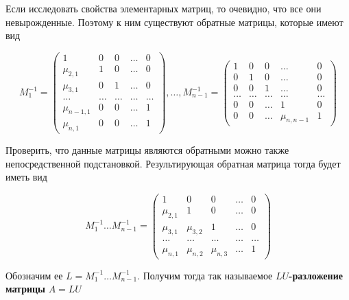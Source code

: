\documentclass[a4paper,article,14pt]{extarticle}
\begin{document}
Если исследовать свойства элементарных матриц, то очевидно,
что все они невырожденные. Поэтому к ним существуют обратные матрицы,
которые имеют вид

\begin{equation}
    M_1^{-1} = \left(
        \begin{matrix}
            1 & 0 & 0 & \dots & 0 \\
            \mu_{2, 1} & 1 & 0 & \dots & 0 \\
            \mu_{3, 1} & 0 & 1 & \dots & 0 \\
            \dots & \dots & \dots & \dots & \dots \\
            \mu_{n - 1, 1} & 0 & 0 & \dots & 1 \\
            \mu_{n, 1} & 0 & 0 & \dots & 1 
        \end{matrix}
    \right),
    \dots,
    M_{n - 1}^{-1} = \left(
        \begin{matrix}
            1 & 0 & 0 & \dots & 0 \\
            0 & 1 & 0 & \dots & 0 \\
            0 & 0 & 1 & \dots & 0 \\
            \dots & \dots & \dots & \dots & \dots \\ 
            0 & 0 & \dots & 1 & 0 \\
            0 & 0 & \dots & \mu_{n, n - 1} & 1 
        \end{matrix}
    \right)
\end{equation}

Проверить, что данные матрицы являются обратными можно
также непосредственной подстановкой. Результирующая обратная матрица
тогда будет иметь вид

\begin{equation}
    M_1^{-1} \dots M_{n - 1}^{-1} = \left(
        \begin{matrix}
            1 & 0 & 0 & \dots & 0 \\
            \mu_{2, 1} & 1 & 0 & \dots & 0 \\
            \mu_{3, 1} & \mu_{3, 2} & 1 & \dots & 0 \\
            \dots & \dots & \dots & \dots & \dots \\ 
            \mu_{n, 1} & \mu_{n, 2} & \mu_{n, 3} & \dots & 1
        \end{matrix}
    \right)
\end{equation}

Обозначим ее $ L = M_1^{-1} \dots M_{n - 1}^{-1}$.
Получим тогда так называемое \textbf{$LU$-разложение матрицы}
$A = LU$
\end{document}
